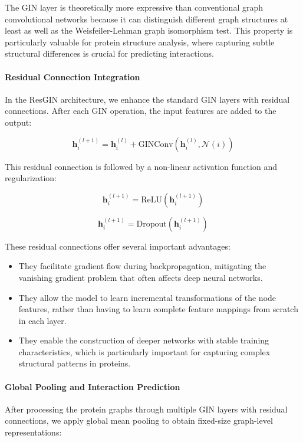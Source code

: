 \documentclass[conference]{IEEEtran}
\begin{document}
The GIN layer is theoretically more expressive than conventional graph convolutional networks because it can distinguish different graph structures at least as well as the Weisfeiler-Lehman graph isomorphism test. This property is particularly valuable for protein structure analysis, where capturing subtle structural differences is crucial for predicting interactions.

\paragraph{Residual Connection Integration}
In the ResGIN architecture, we enhance the standard GIN layers with residual connections. After each GIN operation, the input features are added to the output:

\begin{equation}
\mathbf{h}_i^{(l+1)} = \mathbf{h}_i^{(l)} + \text{GINConv}(\mathbf{h}_i^{(l)}, \mathcal{N}(i))
\end{equation}

This residual connection is followed by a non-linear activation function and regularization:

\begin{equation}
\mathbf{h}_i^{(l+1)} = \text{ReLU}(\mathbf{h}_i^{(l+1)})
\end{equation}

\begin{equation}
\mathbf{h}_i^{(l+1)} = \text{Dropout}(\mathbf{h}_i^{(l+1)})
\end{equation}

These residual connections offer several important advantages:
\begin{itemize}
    \item They facilitate gradient flow during backpropagation, mitigating the vanishing gradient problem that often affects deep neural networks.
    \item They allow the model to learn incremental transformations of the node features, rather than having to learn complete feature mappings from scratch in each layer.
    \item They enable the construction of deeper networks with stable training characteristics, which is particularly important for capturing complex structural patterns in proteins.
\end{itemize}

\paragraph{Global Pooling and Interaction Prediction}
After processing the protein graphs through multiple GIN layers with residual connections, we apply global mean pooling to obtain fixed-size graph-level representations:
\end{document}
